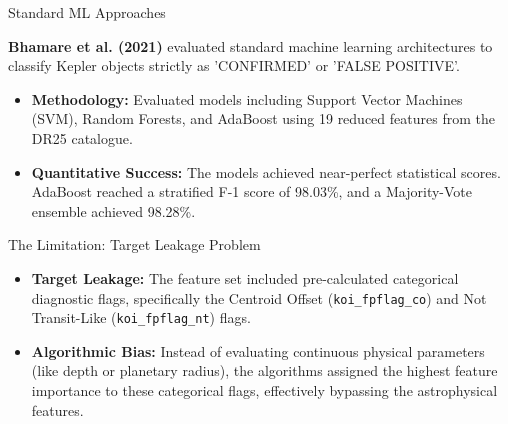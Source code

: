 \documentclass[9pt, aspectratio=169]{beamer}
\begin{document}
\begin{frame}{Standard ML Approaches}

    \textbf{Bhamare et al. (2021)} evaluated standard machine learning architectures to classify Kepler objects strictly as 'CONFIRMED' or 'FALSE POSITIVE'.

    \vspace{0.2cm}
    \begin{itemize}
        \item \textbf{Methodology:} Evaluated models including Support Vector Machines (SVM), Random Forests, and AdaBoost using 19 reduced features from the DR25 catalogue. 
        \item \textbf{Quantitative Success:} The models achieved near-perfect statistical scores. AdaBoost reached a stratified F-1 score of 98.03\%, and a Majority-Vote ensemble achieved 98.28\%.
    \end{itemize}

    \vspace{0.2cm}
    \begin{block}{The Limitation: Target Leakage Problem}
        \begin{itemize}
            \item \textbf{Target Leakage:} The feature set included pre-calculated categorical diagnostic flags, specifically the Centroid Offset (\texttt{koi\_fpflag\_co}) and Not Transit-Like (\texttt{koi\_fpflag\_nt}) flags.
            \item \textbf{Algorithmic Bias:} Instead of evaluating continuous physical parameters (like depth or planetary radius), the algorithms assigned the highest feature importance to these categorical flags, effectively bypassing the astrophysical features.
        \end{itemize}
    \end{block}
\end{frame}
\end{document}
